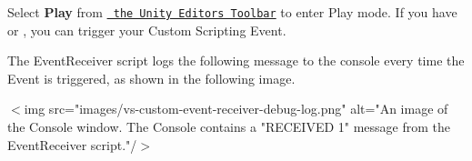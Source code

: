 \begin{DoxyEnumerate}
\item Select {\bfseries{Play}} from \href{https://docs.unity3d.com/Manual/Toolbar.html}{\texttt{ the Unity Editor\textquotesingle{}s Toolbar}} to enter Play mode. If you have  or , you can trigger your Custom Scripting Event.

The {\ttfamily Event\+Receiver} script logs the following message to the console every time the Event is triggered, as shown in the following image.

\texorpdfstring{$<$}{<}img src="{}images/vs-\/custom-\/event-\/receiver-\/debug-\/log.\+png"{} alt="{}\+An image of the Console window. The Console contains a "{}RECEIVED 1"{} message from the Event\+Receiver script."{}/\texorpdfstring{$>$}{>} 
\end{DoxyEnumerate}